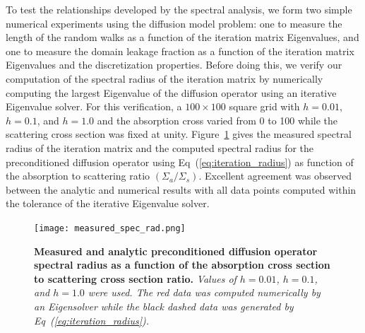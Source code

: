 \documentclass{mc2013}
\begin{document}
To test the relationships developed by the spectral analysis, we form
two simple numerical experiments using the diffusion model problem:
one to measure the length of the random walks as a function of the
iteration matrix Eigenvalues, and one to measure the domain leakage
fraction as a function of the iteration matrix Eigenvalues and the
discretization properties. Before doing this, we verify our
computation of the spectral radius of the iteration matrix by
numerically computing the largest Eigenvalue of the diffusion operator
using an iterative Eigenvalue solver. For this verification, a $100
\times 100$ square grid with $h=0.01$, $h=0.1$, and $h=1.0$ and the
absorption cross varied from 0 to 100 while the scattering cross
section was fixed at unity. Figure~\ref{fig:measured_spec_rad} gives
the measured spectral radius of the iteration matrix and the computed
spectral radius for the preconditioned diffusion operator using
Eq~(\ref{eq:iteration_radius}) as function of the absorption to
scattering ratio $(\Sigma_a / \Sigma_s)$. Excellent agreement was
observed between the analytic and numerical results with all data
points computed within the tolerance of the iterative Eigenvalue
solver.
\begin{figure}[ht!]
  \begin{spacing}{1.0}
    \begin{center}
      \texttt{[image: measured\_spec\_rad.png]}
    \end{center}
    \caption{\textbf{Measured and analytic preconditioned diffusion
        operator spectral radius as a function of the absorption cross
        section to scattering cross section ratio.} \textit{Values of
        $h=0.01$, $h=0.1$, and $h=1.0$ were used. The red data was
        computed numerically by an Eigensolver while the black dashed
        data was generated by Eq~(\ref{eq:iteration_radius}).}}
    \label{fig:measured_spec_rad}
  \end{spacing}
\end{figure}

\label{subsec:walk_length}
\end{document}
